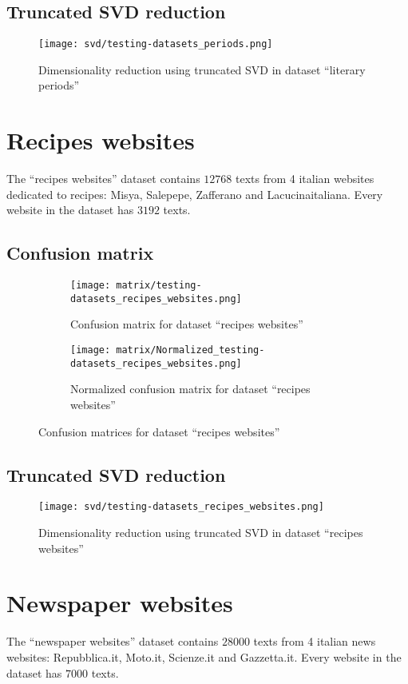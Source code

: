 \documentclass[\main/main.tex]{subfiles}
\begin{document}
\subsection{Truncated SVD reduction}
\begin{figure}
	\texttt{[image: svd/testing-datasets\_periods.png]}
	\caption{Dimensionality reduction using truncated SVD in dataset ``literary periods''}
\end{figure}

\clearpage
\section{Recipes websites}
The ``recipes websites'' dataset contains \(12768\) texts from 4 italian websites dedicated to recipes: Misya, Salepepe, Zafferano and Lacucinaitaliana. Every website in the dataset has \(3192\) texts.
\subsection{Confusion matrix}
\begin{figure}
	\begin{subfigure}{0.40\textwidth}
		\texttt{[image: matrix/testing-datasets\_recipes\_websites.png]}
		\caption{Confusion matrix for dataset ``recipes websites''}
	\end{subfigure}
	\begin{subfigure}{0.40\textwidth}
		\texttt{[image: matrix/Normalized\_testing-datasets\_recipes\_websites.png]}
		\caption{Normalized confusion matrix for dataset ``recipes websites''}
	\end{subfigure}
	\caption{Confusion matrices for dataset ``recipes websites''}
\end{figure}
\subsection{Truncated SVD reduction}
\begin{figure}
	\texttt{[image: svd/testing-datasets\_recipes\_websites.png]}
	\caption{Dimensionality reduction using truncated SVD in dataset ``recipes websites''}
\end{figure}

\clearpage
\section{Newspaper websites}
The ``newspaper websites'' dataset contains \(28000\) texts from 4 italian news websites: Repubblica.it, Moto.it, Scienze.it and Gazzetta.it. Every website in the dataset has \(7000\) texts.
\end{document}
